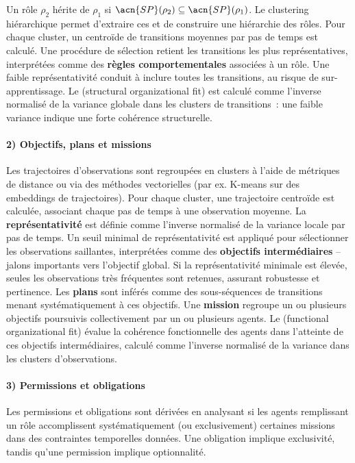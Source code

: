 Un rôle $\rho_2$ hérite de $\rho_1$ si $\acn{SP}(\rho_2) \subseteq \acn{SP}(\rho_1)$.
Le clustering hiérarchique permet d'extraire ces  et de construire une hiérarchie des rôles.
Pour chaque cluster, un centroïde de transitions moyennes par pas de temps est calculé. Une procédure de sélection retient les transitions les plus représentatives, interprétées comme des \textbf{règles comportementales} associées à un rôle.
Une faible représentativité conduit à inclure toutes les transitions, au risque de sur-apprentissage.
Le \textbf{} (structural organizational fit) est calculé comme l'inverse normalisé de la variance globale dans les clusters de transitions~: une faible variance indique une forte cohérence structurelle.

\paragraph{2) Objectifs, plans et missions}
Les trajectoires d'observations sont regroupées en clusters à l'aide de métriques de distance ou via des méthodes vectorielles (par ex. K-means sur des embeddings de trajectoires). Pour chaque cluster, une trajectoire centroïde est calculée, associant chaque pas de temps à une observation moyenne.
La \textbf{représentativité} est définie comme l'inverse normalisé de la variance locale par pas de temps.
Un seuil minimal de représentativité est appliqué pour sélectionner les observations saillantes, interprétées comme des \textbf{objectifs intermédiaires} – jalons importants vers l'objectif global.
Si la représentativité minimale est élevée, seules les observations très fréquentes sont retenues, assurant robustesse et pertinence.
Les \textbf{plans} sont inférés comme des sous-séquences de transitions menant systématiquement à ces objectifs.
Une \textbf{mission} regroupe un ou plusieurs objectifs poursuivis collectivement par un ou plusieurs agents.
Le \textbf{} (functional organizational fit) évalue la cohérence fonctionnelle des agents dans l'atteinte de ces objectifs intermédiaires, calculé comme l'inverse normalisé de la variance dans les clusters d'observations.

\paragraph{3) Permissions et obligations}
Les permissions et obligations sont dérivées en analysant si les agents remplissant un rôle accomplissent systématiquement (ou exclusivement) certaines missions dans des contraintes temporelles données.
Une obligation implique exclusivité, tandis qu'une permission implique optionnalité.

